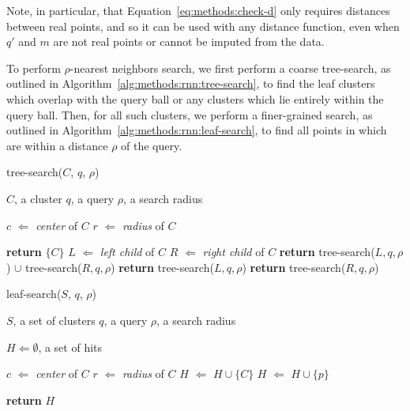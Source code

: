 Note, in particular, that Equation~\ref{eq:methods:check-d} only requires distances between real points, and so it can be used with any distance function, even when $q'$ and $m$ are not real points or cannot be imputed from the data.

To perform $\rho$-nearest neighbors search, we first perform a coarse tree-search, as outlined in Algorithm~\ref{alg:methods:rnn:tree-search}, to find the leaf clusters which overlap with the query ball or any clusters which lie entirely within the query ball.
Then, for all such clusters, we perform a finer-grained search, as outlined in Algorithm~\ref{alg:methods:rnn:leaf-search}, to find all points in which are within a distance $\rho$ of the query.

\begin{algorithm} 
    \caption{tree-search($C$, $q$, $\rho$)} 
    \label{alg:methods:rnn:tree-search} 
    \begin{algorithmic}
        \REQUIRE $C$, a cluster
        \REQUIRE $q$, a query
        \REQUIRE $\rho$, a search radius

        \STATE $c$ $\Leftarrow$ \emph{center} of $C$
        \STATE $r$ $\Leftarrow$ \emph{radius} of $C$

            \STATE \textbf{return} $\{C\}$
            \STATE $L$ $\Leftarrow$ \emph{left child} of $C$
            \STATE $R$ $\Leftarrow$ \emph{right child} of $C$
            \STATE \textbf{return} tree-search($L, q, \rho$) $\cup$ tree-search($R, q, \rho$)
            \STATE \textbf{return} tree-search($L, q, \rho$)
        \ELSE
            \STATE \textbf{return} tree-search($R, q, \rho$)
        \ENDIF
    \end{algorithmic}
\end{algorithm}

\begin{algorithm} 
    \caption{leaf-search($S$, $q$, $\rho$)} 
    \label{alg:methods:rnn:leaf-search} 
    \begin{algorithmic}
        \REQUIRE $S$, a set of clusters
        \REQUIRE $q$, a query
        \REQUIRE $\rho$, a search radius

        \STATE $H \Leftarrow \emptyset$, a set of hits

            \STATE $c$ $\Leftarrow$ \emph{center} of $C$
            \STATE $r$ $\Leftarrow$ \emph{radius} of $C$
                \STATE $H$ $\Leftarrow$ $H \cup \{C\}$
            \ELSE
                        \STATE $H$ $\Leftarrow$ $H \cup \{p\}$
                    \ENDIF
                \ENDFOR
            \ENDIF
        \ENDFOR

        \STATE \textbf{return} $H$
    \end{algorithmic}
\end{algorithm}

